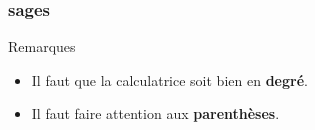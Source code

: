 \documentclass{beamer}
\begin{document}
\begin{frame}
  \frametitle{{}sages}

  \begin{block}{Remarques} 
    \begin{itemize}
    \item Il faut que la calculatrice soit bien en \textbf{degré}.
    \item Il faut faire attention aux \textbf{parenthèses}.
    \end{itemize}
      
  \end{block}  
  
\end{frame}
\end{document}
